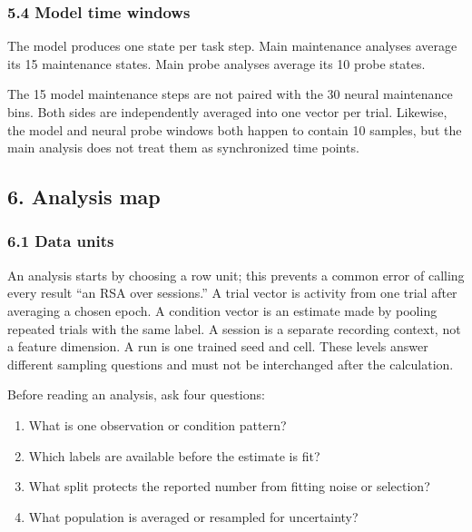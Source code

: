 \documentclass[
  10pt,
]{article}
\providecommand{\tightlist}{%
  \setlength{\itemsep}{0pt}\setlength{\parskip}{0pt}}
\begin{document}
\hypertarget{model-time-windows}{%
\subsubsection{5.4 Model time windows}\label{model-time-windows}}

The model produces one state per task step. Main maintenance analyses
average its 15 maintenance states. Main probe analyses average its 10
probe states.

The 15 model maintenance steps are not paired with the 30 neural
maintenance bins. Both sides are independently averaged into one vector
per trial. Likewise, the model and neural probe windows both happen to
contain 10 samples, but the main analysis does not treat them as
synchronized time points.

\hypertarget{analysis-map}{%
\subsection{6. Analysis map}\label{analysis-map}}

\hypertarget{data-units}{%
\subsubsection{6.1 Data units}\label{data-units}}

An analysis starts by choosing a row unit; this prevents a common error
of calling every result ``an RSA over sessions.'' A trial vector is
activity from one trial after averaging a chosen epoch. A condition
vector is an estimate made by pooling repeated trials with the same
label. A session is a separate recording context, not a feature
dimension. A run is one trained seed and cell. These levels answer
different sampling questions and must not be interchanged after the
calculation.

Before reading an analysis, ask four questions:

\begin{enumerate}
\def\labelenumi{\arabic{enumi}.}
\tightlist
\item
  What is one observation or condition pattern?
\item
  Which labels are available before the estimate is fit?
\item
  What split protects the reported number from fitting noise or
  selection?
\item
  What population is averaged or resampled for uncertainty?
\end{enumerate}
\end{document}
